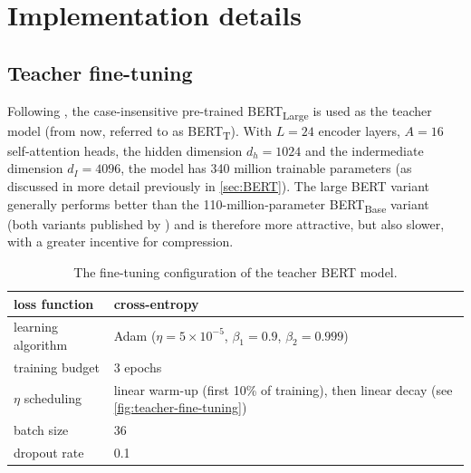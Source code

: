 \documentclass[bsc,frontabs,singlespacing,parskip,deptreport]{infthesis}
\def\BERTT{BERT\textsubscript{T}}
\begin{document}
{  \section{Implementation details}{
    \label{sec:implementation-details}
    \subsection{Teacher fine-tuning}{
      Following \citet{Tang_2019b}, the case-insensitive pre-trained BERT\textsubscript{Large} is used as the teacher model (from now, referred to as \BERTT).
      With $L=24$ encoder layers, $A=16$ self-attention heads, the hidden dimension $d_h=1024$ and the indermediate dimension $d_I=4096$, the model has 340 million trainable parameters (as discussed in more detail previously in \autoref{sec:BERT}).
      The large BERT variant generally performs better than the 110-million-parameter BERT\textsubscript{Base} variant (both variants published by \citet{Devlin_2018}) and is therefore more attractive, but also slower, with a greater incentive for compression.

      \begin{table}[h!t]
      \centering
      \footnotesize
      \begin{tabular}{m{}m{}}
      \toprule
      loss function & cross-entropy \\
      \hline
      learning algorithm & Adam ($\eta=5\times10^{-5}$, $\beta_1=0.9$, $\beta_2=0.999$) \\
      \hline
      training budget & 3 epochs \\
      \hline
      $\eta$ scheduling & linear warm-up (first 10\% of training), then linear decay (see \autoref{fig:teacher-fine-tuning}) \\
      \hline
      batch size & 36 \\
      \hline
      dropout rate & 0.1 \\
      \bottomrule
      \end{tabular}
      \caption{The fine-tuning configuration of the teacher BERT model.}
      \label{tab:initial-config-teacher}
      \end{table}

}}}
\end{document}
